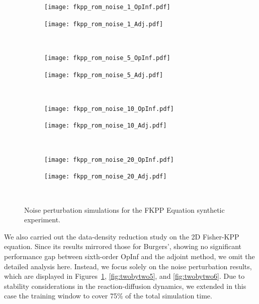 \begin{figure}[h!]
  \centering
  \begin{subfigure}[c]{0.49\textwidth}
      \centering
      \texttt{[image: fkpp\_rom\_noise\_1\_OpInf.pdf]}
  \end{subfigure}
  \begin{subfigure}[c]{0.49\textwidth}
      \centering
      \texttt{[image: fkpp\_rom\_noise\_1\_Adj.pdf]}
  \end{subfigure} \\[1ex]
    
  \begin{subfigure}[c]{0.49\textwidth}
      \centering
      \texttt{[image: fkpp\_rom\_noise\_5\_OpInf.pdf]}
  \end{subfigure} 
  \begin{subfigure}[c]{0.49\textwidth}
      \centering
      \texttt{[image: fkpp\_rom\_noise\_5\_Adj.pdf]}
  \end{subfigure} \\[1ex]
    
  \begin{subfigure}[c]{0.49\textwidth}
      \centering
      \texttt{[image: fkpp\_rom\_noise\_10\_OpInf.pdf]}
  \end{subfigure} 
  \begin{subfigure}[c]{0.49\textwidth}
      \centering
      \texttt{[image: fkpp\_rom\_noise\_10\_Adj.pdf]}
  \end{subfigure} \\[1ex]
    
  \begin{subfigure}[c]{0.49\textwidth}
      \centering
      \texttt{[image: fkpp\_rom\_noise\_20\_OpInf.pdf]}
  \end{subfigure} 
  \begin{subfigure}[c]{0.49\textwidth}
      \centering
      \texttt{[image: fkpp\_rom\_noise\_20\_Adj.pdf]}
  \end{subfigure} \\[1ex]
  \caption{Noise perturbation simulations for the FKPP Equation synthetic experiment.}
  \label{fig:five_by_two4}
\end{figure}

\newpage


We also carried out the data-density reduction study on the 2D Fisher-KPP equation. Since its results mirrored those for Burgers’, showing no significant performance gap between sixth-order OpInf and the adjoint method, we omit the detailed analysis here. Instead, we focus solely on the noise perturbation results, which are displayed in Figures~\ref{fig:five_by_two4}, \ref{fig:twobytwo5}, and \ref{fig:twobytwo6}. Due to stability considerations in the reaction-diffusion dynamics, we extended in this case the training window to cover 75\% of the total simulation time.

